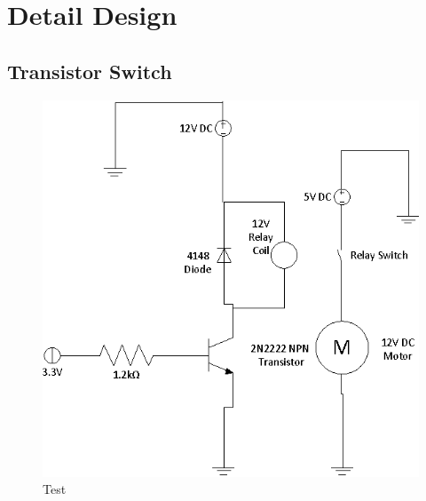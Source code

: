 \chapter{Detail Design}

\section{Transistor Switch}

\begin{figure}[t]
\centering
\includegraphics[width=1.0\textwidth]{relay_switch.eps}
\caption{Test}
\end{figure}